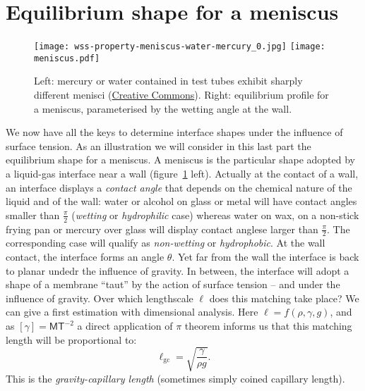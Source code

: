 \section{Equilibrium shape for a meniscus}
\begin{figure}[htbp]
\begin{center}
\texttt{[image: wss-property-meniscus-water-mercury\_0.jpg]}
\texttt{[image: meniscus.pdf]} 
\end{center}
\caption{Left: mercury or water contained in test tubes exhibit sharply different menisci (\href{https://www.usgs.gov/media/images/water-has-upward-meniscus-mercury-has-a-downward-meniscus}{Creative Commons}). Right: equilibrium profile for a meniscus, parameterised by the wetting angle at the wall.}
\label{fig:meniscus}
\end{figure}
We now have all the keys to determine interface shapes under the influence of surface tension. As an illustration we will consider in this last part the equilibrium shape for a meniscus. A meniscus is the particular shape adopted by a liquid-gas interface near a wall (figure~\ref{fig:meniscus} left). Actually at the contact of a wall, an interface displays a \textit{contact angle} that depends on the chemical nature of the liquid and of the wall: water or alcohol on glass or metal will have contact angles smaller than $\frac{\pi}{2}$ (\textit{wetting} or \textit{hydrophilic} case) whereas water on wax, on a non-stick frying pan or mercury over glass will display contact anglese larger than $\frac{\pi}{2}$. The corresponding case will qualify as \textit{non-wetting} or \textit{hydrophobic}.
 At the wall contact, the interface forms an angle $\theta$. Yet far from the wall the interface is back to planar undedr the influence of gravity. In between, the interface will adopt a shape of a membrane ``taut'' by the action of surface tension -- and under the influence of gravity. Over which lengthscale $\ell$ does this matching take place? We can give a first estimation with dimensional analysis. Here $\ell = f(\rho, \gamma, g)$, and as $[\gamma] = \mathsf{M}\mathsf{T}^{-2}$ a direct application of $\pi$ theorem informs us that this matching length will be proportional to:
\begin{equation}
\ell_\text{gc} = \sqrt{\frac{\gamma}{\rho g}}.
\end{equation}
This is the \textit{gravity-capillary length} (sometimes simply coined capillary length).

